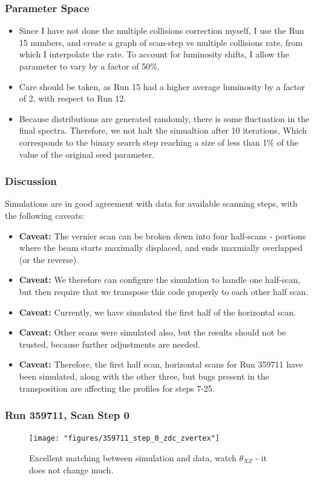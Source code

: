 \begin{frame}
	\frametitle{Parameter Space}
	\begin{itemize}
		\item Since I have not done the multiple collisions correction myself, I
			use the Run 15 numbers, and create a graph of scan-step vs multiple
			collisions rate, from which I interpolate the rate. To account for
			luminosity shifts, I allow the parameter to vary by a factor of 50\%.
		\item Care should be taken, as Run 15 had a higher average luminosity by a
			factor of 2, with respect to Run 12.
		\item Because distributions are generated randomly, there is some
			fluctuation in the final spectra. Therefore, we not halt the simualtion
			after 10 iterations, Which corresponds to the binary search step reaching
			a size of less than 1\% of the value of the original seed parameter.
	\end{itemize}
\end{frame}

\begin{frame}
\frametitle{Discussion}
Simulations are in good agreement with data for available scanning steps, with
the following caveats:
\begin{itemize}
	\item \textbf{Caveat:} The vernier scan can be broken down into four
		half-scans - portions where the beam starts maximally displaced, and ends
		maxmially overlapped (or the reverse).
	\item \textbf{Caveat:} We therefore can configure the simulation to handle
		one half-scan, but then require that we transpose this code properly to
		each other half scan.
\item \textbf{Caveat:} Currently, we have simulated the first half of the
	horizontal scan.
\item \textbf{Caveat:} Other scans were simulated also, but the results should
	not be trusted, because further adjustments are needed.
\item \textbf{Caveat:} Therefore, the first half scan, horizontal scans for Run
	359711 have been simulated, along with the other three, but bugs present in
	the transposition are affecting the profiles for steps 7-25.
\end{itemize}

\end{frame}


\begin{frame}
\frametitle{Run 359711, Scan Step 0}
\begin{figure}
\begin{center}
\texttt{[image: "figures/359711\_step\_0\_zdc\_zvertex"]}
\caption{Excellent matching between simulation and data, watch $\theta_{XZ}$ - it does not change much.}
\label{fig:359711_step_0_zdc_zvertex}
\end{center}
\end{figure}
\end{frame}

